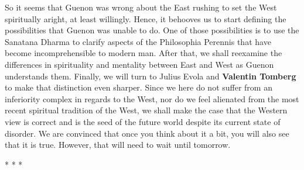 So it seems that Guenon was wrong about the East rushing to set the West spiritually aright, at least willingly. Hence, it behooves us to start defining the possibilities that Guenon was unable to do. One of those possibilities is to use the Sanatana Dharma to clarify aspects of the Philosophia Perennis that have become incomprehensible to modern man. After that, we shall reexamine the differences in spirituality and mentality between East and West as Guenon understands them. Finally, we will turn to Julius Evola and \textbf{Valentin Tomberg} to make that distinction even sharper. Since we here do not suffer from an inferiority complex in regards to the West, nor do we feel alienated from the most recent spiritual tradition of the West, we shall make the case that the Western view is correct and is the seed of the future world despite its current state of disorder. We are convinced that once you think about it a bit, you will also see that it is true. However, that will need to wait until tomorrow.



\begin{center}* * *\end{center}

